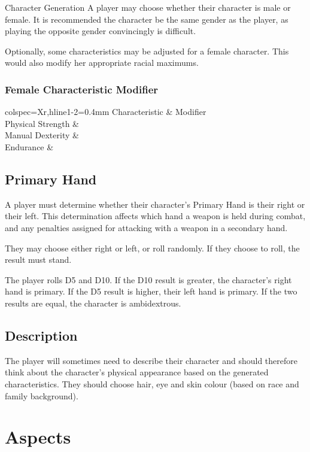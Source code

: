 \begin{Chapter}{Character Generation}
A player may choose whether their character is male or female.  It is
recommended the character be the same gender as the player, as playing
the opposite gender convincingly is difficult.

Optionally, some characteristics may be adjusted for a female
character.  This would also modify her appropriate racial maximums.

\subsubsection{Female Characteristic Modifier}

\begin{dqtblr}{colspec={Xr},hline{1-2}={0.4mm}}
Characteristic		& Modifier \\
Physical Strength	&  \\
Manual Dexterity	&  \\
Endurance		&  \\
\end{dqtblr}

\subsection{Primary Hand}

A player must determine whether their character’s Primary Hand is
their right or their left.  This determination affects which hand a
weapon is held during combat, and any penalties assigned for attacking
with a weapon in a secondary hand.

They may choose either right or left, or roll randomly. If they choose
to roll, the result must stand.

The player rolls D5 and D10.  If the D10 result is greater, the
character’s right hand is primary. If the D5 result is higher, their
left hand is primary. If the two results are equal, the character is
ambidextrous.

\subsection{Description}

The player will sometimes need to describe their character and should
therefore think about the character’s physical appearance based on the
generated characteristics.  They should choose hair, eye and skin
colour (based on race and family background).

\section{Aspects}
\label{aspects}


\end{Chapter}
